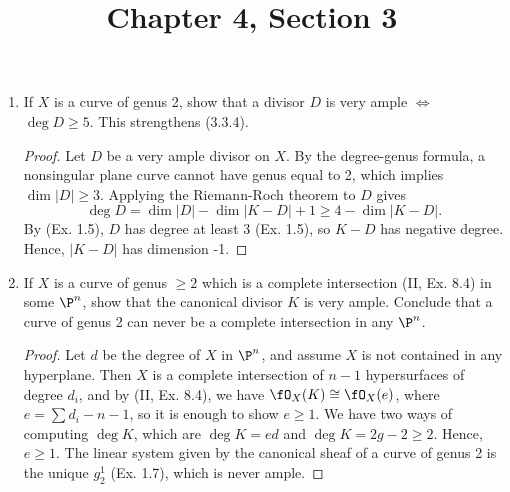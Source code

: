 \documentclass[a4paper]{article}
\title{Chapter 4, Section 3}
\begin{document}
\maketitle

\begin{enumerate} [label=\textbf{\arabic*.}, leftmargin=0em]

  \item If $X$ is a curve of genus 2, show that a divisor $D$ is very ample $\iff$ $\deg{D} \geq 5$.
        This strengthens (3.3.4).

        \begin{proof}
          Let $D$ be a very ample divisor on $X$.
          By the degree-genus formula, a nonsingular plane curve cannot have genus equal to 2, which implies $\dim |D| \geq 3$.
          Applying the Riemann-Roch theorem to $D$ gives
          \begin{equation*}
            \deg{D} = \dim |D| - \dim |K - D| + 1 \geq 4 - \dim|K - D|.
          \end{equation*}
          By (Ex. 1.5), $D$ has degree at least 3 (Ex. 1.5), so $K - D$ has negative degree.
          Hence, $|K - D|$ has dimension -1.
        \end{proof}

  \item[\textbf{3.}] If $X$ is a curve of genus $\geq 2$ which is a complete intersection (II, Ex. 8.4) in some $\P^n$, show that the canonical divisor $K$ is very ample.
        Conclude that a curve of genus 2 can never be a complete intersection in any $\P^n$.

        \begin{proof}
          Let $d$ be the degree of $X$ in $\P^n$, and assume $X$ is not contained in any hyperplane.
          Then $X$ is a complete intersection of $n - 1$ hypersurfaces of degree $d_i$, and by (II, Ex. 8.4), we have $\fO_X(K) \cong \fO_X(e)$, where $e = \sum d_i - n - 1$, so it is enough to show $e \geq 1$.
          We have two ways of computing $\deg{K}$, which are $\deg{K} = ed$ and $\deg{K} = 2g - 2 \geq 2$.
          Hence, $e \geq 1$.
          The linear system given by the canonical sheaf of a curve of genus 2 is the unique $g^1_2$ (Ex. 1.7), which is never ample.
        \end{proof}


\end{enumerate}
\end{document}
